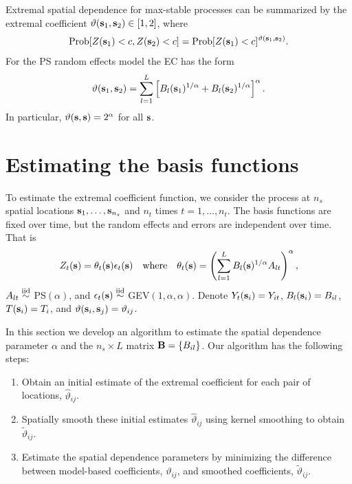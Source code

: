 Extremal spatial dependence for max-stable processes can be summarized by the extremal coefficient \citep[EC]{Schlather2003} $\vartheta(\mathbf{s}_1, \mathbf{s}_2)\in[1,2]$, where
\begin{align} \label{ebeq:ECdev}
  \mbox{Prob}[Z(\mathbf{s}_1)<c, Z(\mathbf{s}_2)<c] = \mbox{Prob}[Z(\mathbf{s}_1)<c]^{\vartheta(\mathbf{s}_1,\mathbf{s}_2)}.
\end{align}
For the PS random effects model the EC has the form
\begin{align} \label{ebeq:EC}
   \vartheta(\mathbf{s}_1,\mathbf{s}_2) = \sum_{l=1}^L \left[B_{l}(\mathbf{s}_1)^{1/\alpha}+B_{l}(\mathbf{s}_2)^{1/\alpha}\right]^\alpha.
\end{align}
In particular, $\vartheta(\mathbf{s},\mathbf{s}) = 2^{\alpha}$ for all $\mathbf{s}$.

\section{Estimating the basis functions} \label{ebs:estimation}

To estimate the extremal coefficient function, we consider the process at $n_s$ spatial locations $\mathbf{s}_1,\ldots,\mathbf{s}_{n_s}$ and $n_t$ times $t=1,\ldots,n_t$.
The basis functions are fixed over time, but the random effects and errors are independent over time.
That is
\begin{align}
  Z_t(\mathbf{s}) = \theta_t(\mathbf{s}) \epsilon_t(\mathbf{s}) \quad \mathrm{where} \quad \theta_t(\mathbf{s}) = \left(\displaystyle \sum_{l=1}^L B_{l}(\mathbf{s})^{1/\alpha}A_{lt}\right)^{\alpha},
\end{align}
$A_{lt} \stackrel{\mathrm{iid}}{\sim}$ PS$(\alpha)$, and $\epsilon_t(\mathbf{s}) \stackrel{\mathrm{iid}}{\sim}$ GEV$(1, \alpha, \alpha)$.
Denote $Y_t(\mathbf{s}_i) = Y_{it}$, $B_l(\mathbf{s}_i) = B_{il}$, $T(\mathbf{s}_i)=T_i$, and $\vartheta(\mathbf{s}_i,\mathbf{s}_j) = \vartheta_{ij}$.

In this section we develop an algorithm to estimate the spatial dependence parameter $\alpha$ and the $n_s\times L$ matrix $\mathbf{B} = \{B_{il}\}$.
Our algorithm has the following steps:
\begin{enumerate}[(1)]
  \item Obtain an initial estimate of the extremal coefficient for each pair of locations, ${\hat \vartheta}_{ij}$.
  \item Spatially smooth these initial estimates ${\hat \vartheta}_{ij}$ using kernel smoothing to obtain ${\tilde \vartheta}_{ij}$.
  \item Estimate the spatial dependence parameters by minimizing the difference between model-based coefficients, $\vartheta_{ij}$, and smoothed coefficients, ${\tilde \vartheta}_{ij}$.
\end{enumerate}

